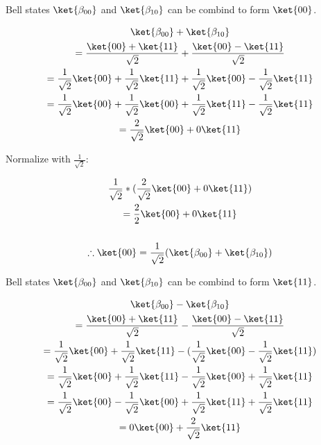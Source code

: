 \documentclass[]{article}
\begin{document}
\begin{enumerate}
        Bell states $\ket{\beta_{00}}$ and $\ket{\beta_{10}}$ can be combind to form $\ket{00}$.

        \begin{gather*}
          \ket{\beta_{00}} + \ket{\beta_{10}} \\
          = \frac{\ket{00} + \ket{11}}{\sqrt{2}} + \frac{\ket{00} - \ket{11}}{\sqrt{2}} \\
          = \frac{1}{\sqrt{2}} \ket{00} + \frac{1}{\sqrt{2}} \ket{11} + \frac{1}{\sqrt{2}} \ket{00}
          - \frac{1}{\sqrt{2}} \ket{11} \\ 
          = \frac{1}{\sqrt{2}} \ket{00} + \frac{1}{\sqrt{2}} \ket{00} + \frac{1}{\sqrt{2}} \ket{11}
          - \frac{1}{\sqrt{2}} \ket{11} \\  
          = \frac{2}{\sqrt{2}} \ket{00} + 0 \ket{11} \\
        \end{gather*}

        Normalize with $\frac{1}{\sqrt{2}}$:

        \begin{gather*}
          \frac{1}{\sqrt{2}} * (\frac{2}{\sqrt{2}} \ket{00} + 0 \ket{11})\\
          = \frac{2}{2} \ket{00} + 0 \ket{11} \\ \\
          \therefore \ket{00} = \frac{1}{\sqrt{2}}(\ket{\beta_{00}} + \ket{\beta_{10}})
        \end{gather*}

        \pagebreak
        
        Bell states $\ket{\beta_{00}}$ and $\ket{\beta_{10}}$ can be combind to form $\ket{11}$.

        \begin{gather*}
          \ket{\beta_{00}} - \ket{\beta_{10}} \\
          = \frac{\ket{00} + \ket{11}}{\sqrt{2}} - \frac{\ket{00} - \ket{11}}{\sqrt{2}} \\
          = \frac{1}{\sqrt{2}} \ket{00} + \frac{1}{\sqrt{2}} \ket{11} - (\frac{1}{\sqrt{2}} \ket{00} 
          - \frac{1}{\sqrt{2}} \ket{11}) \\ 
          = \frac{1}{\sqrt{2}} \ket{00} + \frac{1}{\sqrt{2}} \ket{11} - \frac{1}{\sqrt{2}} \ket{00} 
          + \frac{1}{\sqrt{2}} \ket{11} \\ 
          = \frac{1}{\sqrt{2}} \ket{00} - \frac{1}{\sqrt{2}} \ket{00} + \frac{1}{\sqrt{2}} \ket{11} 
          + \frac{1}{\sqrt{2}} \ket{11} \\  
          = 0 \ket{00} + \frac{2}{\sqrt{2}} \ket{11}\\ 
        \end{gather*}


\end{enumerate}
\end{document}

